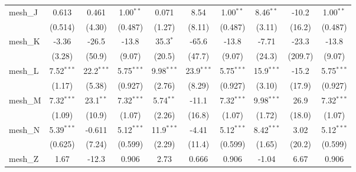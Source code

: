 \begin{tabular}{lccccccccc}
   mesh\_J                                                     & 0.613         & 0.461          & 1.00$^{**}$   & 0.071         & 8.54          & 1.00$^{**}$   & 8.46$^{**}$   & -10.2          & 1.00$^{**}$\\   
                                                               & (0.514)       & (4.30)         & (0.487)       & (1.27)        & (8.11)        & (0.487)       & (3.11)        & (16.2)         & (0.487)\\   
   mesh\_K                                                     & -3.36         & -26.5          & -13.8         & 35.3$^{*}$    & -65.6         & -13.8         & -7.71         & -23.3          & -13.8\\   
                                                               & (3.28)        & (50.9)         & (9.07)        & (20.5)        & (47.7)        & (9.07)        & (24.3)        & (209.7)        & (9.07)\\   
   mesh\_L                                                     & 7.52$^{***}$  & 22.2$^{***}$   & 5.75$^{***}$  & 9.98$^{***}$  & 23.9$^{***}$  & 5.75$^{***}$  & 15.9$^{***}$  & -15.2          & 5.75$^{***}$\\   
                                                               & (1.17)        & (5.38)         & (0.927)       & (2.76)        & (8.29)        & (0.927)       & (3.10)        & (17.9)         & (0.927)\\   
   mesh\_M                                                     & 7.32$^{***}$  & 23.1$^{**}$    & 7.32$^{***}$  & 5.74$^{**}$   & -11.1         & 7.32$^{***}$  & 9.98$^{***}$  & 26.9           & 7.32$^{***}$\\   
                                                               & (1.09)        & (10.9)         & (1.07)        & (2.26)        & (16.8)        & (1.07)        & (1.72)        & (18.0)         & (1.07)\\   
   mesh\_N                                                     & 5.39$^{***}$  & -0.611         & 5.12$^{***}$  & 11.9$^{***}$  & -4.41         & 5.12$^{***}$  & 8.42$^{***}$  & 3.02           & 5.12$^{***}$\\   
                                                               & (0.625)       & (7.24)         & (0.599)       & (2.29)        & (11.4)        & (0.599)       & (1.65)        & (20.2)         & (0.599)\\   
   mesh\_Z                                                     & 1.67          & -12.3          & 0.906         & 2.73          & 0.666         & 0.906         & -1.04         & 6.67           & 0.906\\   

\end{tabular}
